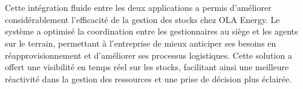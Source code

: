 \documentclass[a4paper, oneside, 12pt, final]{extreport}
\begin{document}
\\
\\
Cette intégration fluide entre les deux applications a permis d'améliorer considérablement l'efficacité de la gestion des stocks chez OLA Energy. Le système a optimisé la coordination entre les gestionnaires au siège et les agents sur le terrain, permettant à l'entreprise de mieux anticiper ses besoins en réapprovisionnement et d'améliorer ses processus logistiques. Cette solution a offert une visibilité en temps réel sur les stocks, facilitant ainsi une meilleure réactivité dans la gestion des ressources et une prise de décision plus éclairée.



\tableofcontents

\listoffigures

\cleardoublepage

\newpage
{}
\end{document}
